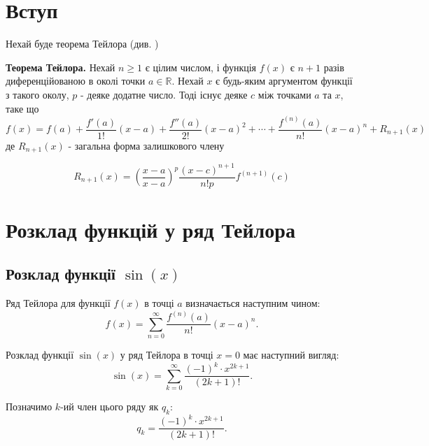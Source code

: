 



	
	\section{Вступ}
	Нехай буде теорема Тейлора (див. \cite{weisstein})
	\begin{theorem}\label{ttt1}
		\textbf{Теорема Тейлора.} Нехай $n\geq1$ є цілим числом, і функція $f(x)$ є $n+1$ разів диференційованою в околі точки $a\in\mathbb{R}$. Нехай $x$ є будь-яким аргументом функції з такого околу, $p$ - деяке додатне число. Тоді існує деяке $c$ між точками $a$ та $x$, таке що
		\begin{equation}\label{mvm}
			f(x)=f(a)+\frac{f'(a)}{1!}(x-a)+\frac{f''(a)}{2!}(x-a)^2+\cdots+\frac{f^{(n)}(a)}{n!}(x-a)^n+R_{n+1}(x)
		\end{equation}
		де $R_{n+1}(x)$ - загальна форма залишкового члену
		
		\begin{equation}\label{xcxxxs}
			R_{n+1}(x)=\left(\frac{x-a}{x-a}\right)^p \frac{(x-c)^{n+1}}{n!p}f^{(n+1)}(c)
		\end{equation}

		\end{theorem}
	\section{Розклад функцій у ряд Тейлора}
	
	\subsection{Розклад функції \( \sin(x) \)}
	
	\begin{definition}
		Ряд Тейлора для функції \( f(x) \) в точці \( a \) визначається наступним чином:
		\[
		f(x) = \sum_{n=0}^{\infty} \frac{f^{(n)}(a)}{n!}(x-a)^n.
		\]
	\end{definition}
	
	\begin{theorem}
		Розклад функції \( \sin(x) \) у ряд Тейлора в точці \( x = 0 \) має наступний вигляд:
		\begin{equation} \label{eq:sin_series}
			\sin(x) = \sum_{k=0}^{\infty} \frac{(-1)^k \cdot x^{2k+1}}{(2k + 1)!}.
		\end{equation}
	\end{theorem}
	
	\begin{definition}
		Позначимо \( k \)-ий член цього ряду як \( q_k \):
		\begin{equation} \label{eq:qk_def}
			q_k = \frac{(-1)^k \cdot x^{2k+1}}{(2k + 1)!}.
		\end{equation}
	\end{definition}
	
